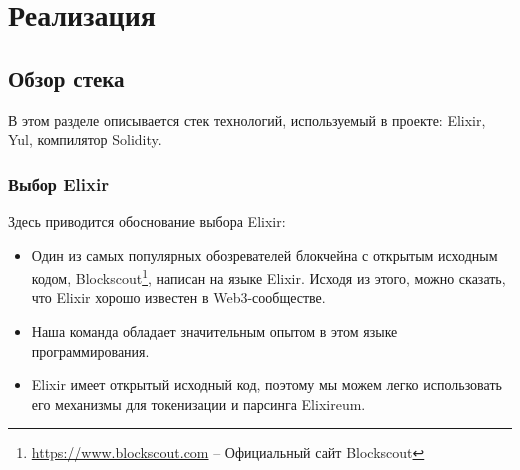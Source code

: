 \chapter{Реализация}
\label{chap:impl}

\section{Обзор стека}
\label{sec:architecture}
В этом разделе описывается стек технологий, используемый в проекте: Elixir, Yul, компилятор Solidity.
\subsection{Выбор Elixir}
Здесь приводится обоснование выбора Elixir:
\begin{itemize}
    \item Один из самых популярных обозревателей блокчейна с открытым исходным кодом, Blockscout\footnote{\href{https://www.blockscout.com/}{https://www.blockscout.com} -- Официальный сайт Blockscout}, написан на языке Elixir. Исходя из этого, можно сказать, что Elixir хорошо известен в Web3-сообществе.
    \item Наша команда обладает значительным опытом в этом языке программирования.
    \item Elixir имеет открытый исходный код, поэтому мы можем легко использовать его механизмы для токенизации и парсинга Elixireum.
\end{itemize}

